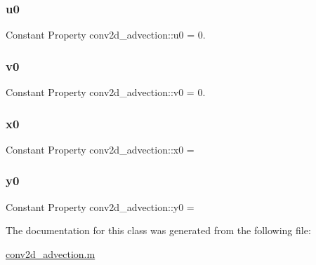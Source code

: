 \subsubsection{\texorpdfstring{u0}{u0}}
{\footnotesize\ttfamily Constant Property conv2d\+\_\+advection\+::u0 = 0.}

\mbox{\label{classconv2d__advection_a93dc8697310f632fc1c1b4acda4b162b}} 
\subsubsection{\texorpdfstring{v0}{v0}}
{\footnotesize\ttfamily Constant Property conv2d\+\_\+advection\+::v0 = 0.}

\mbox{\label{classconv2d__advection_a094162f8b370a8bded121e1fedbebacb}} 
\subsubsection{\texorpdfstring{x0}{x0}}
{\footnotesize\ttfamily Constant Property conv2d\+\_\+advection\+::x0 =}

\mbox{\label{classconv2d__advection_a69dd5d2e161e02f8ae9d16da88dc0b00}} 
\subsubsection{\texorpdfstring{y0}{y0}}
{\footnotesize\ttfamily Constant Property conv2d\+\_\+advection\+::y0 =}



The documentation for this class was generated from the following file\+:\begin{DoxyCompactItemize}
\item 
\hyperlink{conv2d__advection_8m}{conv2d\+\_\+advection.\+m}\end{DoxyCompactItemize}
